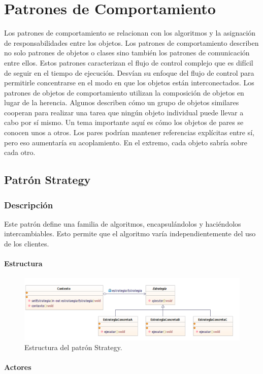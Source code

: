 \section{Patrones de Comportamiento}
Los patrones de comportamiento se relacionan con los algoritmos y la asignación de responsabilidades entre los objetos. Los patrones de comportamiento describen no solo patrones de objetos o clases sino también los patrones de comunicación entre ellos. Estos patrones caracterizan el flujo de control complejo que es difícil de seguir en el tiempo de ejecución. Desvían su enfoque del flujo de control para permitirle concentrarse en el modo en que los objetos están interconectados. Los patrones de objetos de comportamiento utilizan la composición de objetos en lugar de la herencia. Algunos describen cómo un grupo de objetos similares cooperan para realizar una tarea que ningún objeto individual puede llevar a cabo por sí mismo. Un tema importante aquí es cómo los objetos de pares se conocen unos a otros. Los pares podrían mantener referencias explícitas entre sí, pero eso aumentaría su acoplamiento. En el extremo, cada objeto sabría sobre cada otro.\cite{gof}
\subsection{Patrón Strategy}

\subsubsection{Descripción}
Este patrón define una familia de algoritmos, encapsulándolos y haciéndolos intercambiables. Esto permite que el algoritmo varía independientemente del uso de los clientes.
\paragraph{Estructura}

\begin{figure}[th!]
	\centering
	\includegraphics[width=.7\linewidth]{imagenes/Patrones/Strategy.pdf}
	\caption{Estructura del patrón Strategy.\cite{gof}}	
\end{figure}

\paragraph{Actores}

